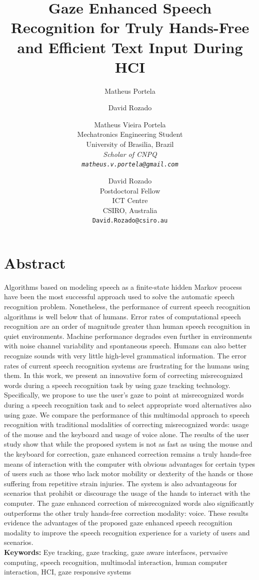 \documentclass[]{article}
\title{Gaze Enhanced Speech Recognition for Truly Hands-Free and Efficient Text Input During HCI}
\author{Matheus Portela}
\author{David Rozado}
\author{
  Matheus Vieira Portela\\
  Mechatronics Engineering Student\\
  University of Brasilia, Brazil\\
  \em{Scholar of CNPQ}\\
  \texttt{matheus.v.portela@gmail.com}\\
  \and
  David Rozado\\
  Postdoctoral Fellow\\
  ICT Centre\\
  CSIRO, Australia\\
  \texttt{David.Rozado@csiro.au}
}
\begin{document}
\maketitle

\section{Abstract}
Algorithms based on modeling speech as a finite-state hidden Markov process have been the most successful approach used
to solve the automatic speech recognition problem. Nonetheless, the performance of current speech recognition algorithms
is well below that of humans. Error rates of computational speech recognition are an order of magnitude greater than
human speech recognition in quiet environments. Machine performance degrades even further in environments with noise
channel variability and spontaneous speech. Humans can also better recognize sounds with very little high-level
grammatical information. The error rates of current speech recognition systems are frustrating for the humans using
them. In this work, we present an innovative form of correcting misrecognized words during a speech recognition task by
using gaze tracking technology. Specifically, we propose to use the user's gaze to point at misrecognized words during a
speech recognition task and to select appropriate word alternatives also using gaze. We compare  the performance of this
multimodal approach to speech recognition with traditional modalities of correcting misrecognized words: usage of the
mouse and the keyboard and usage of voice alone. The results of the user study show that while the proposed system is
not as fast as using the mouse and the keyboard for correction, gaze enhanced correction remains a truly hands-free
means of interaction with the computer with obvious advantages for certain types of users such as those who lack  motor
mobility or dexterity of the hands or those suffering from repetitive strain injuries. The system is also advantageous
for scenarios that prohibit or discourage the usage of the hands to interact with the computer. The gaze enhanced
correction of misrecognized words also significantly outperforms the other truly hands-free correction modality: voice.
These results evidence the advantages of the proposed gaze enhanced speech recognition modality to improve the speech
recognition experience for a variety of users and scenarios.\\


\textbf{Keywords:} Eye tracking, gaze tracking, gaze aware interfaces, pervasive computing, speech recognition,
multimodal interaction, human computer interaction, HCI, gaze responsive systems 
\end{document}
